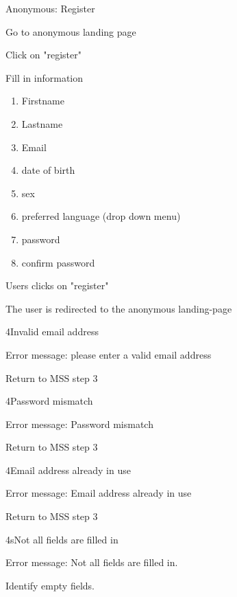 \begin{uc}{Anonymous: Register}

    \begin{uc-mss}
       \item Go to anonymous landing page
       \item Click on "register"
       \item Fill in information
       \begin{enumerate}
       \item Firstname
       \item Lastname
       \item Email
       \item date of birth
       \item sex
       \item preferred language (drop down menu)
       \item password
       \item confirm password
       \end{enumerate}
       \item Users clicks on "register"
       \item The user is redirected to the anonymous landing-page
    \end{uc-mss}

    \begin{uc-ext}

        \begin{uc-fail}{4}{Invalid email address}
        \item Error message: please enter a valid email address
        \item Return to MSS step 3
        \end{uc-fail}

        \begin{uc-fail}{4}{Password mismatch}
        \item Error message: Password mismatch
        \item Return to MSS step 3
        \end{uc-fail}

        \begin{uc-fail}{4}{Email address already in use}
        \item Error message: Email address already in use
        \item Return to MSS step 3
        \end{uc-fail}

        \begin{uc-fail}{4s}{Not all fields are filled in}
        \item Error message: Not all fields are filled in.
        \item Identify empty fields.
        \end{uc-fail}


\end{uc-ext}
\end{uc}
